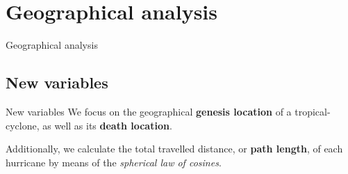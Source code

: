 \section{Geographical analysis}
\begin{darkframes}
	\begin{frame}
		\huge Geographical analysis
	\end{frame}
\end{darkframes}

\subsection{New variables}
\begin{frame}{New variables}
	We focus on the geographical \textbf{genesis location} of a tropical-cyclone, as well as its \textbf{death location}.

	\medskip
	Additionally, we calculate the total travelled distance, or \textbf{path length}, of each hurricane by means of the \emph{spherical law of cosines}.
\end{frame}

